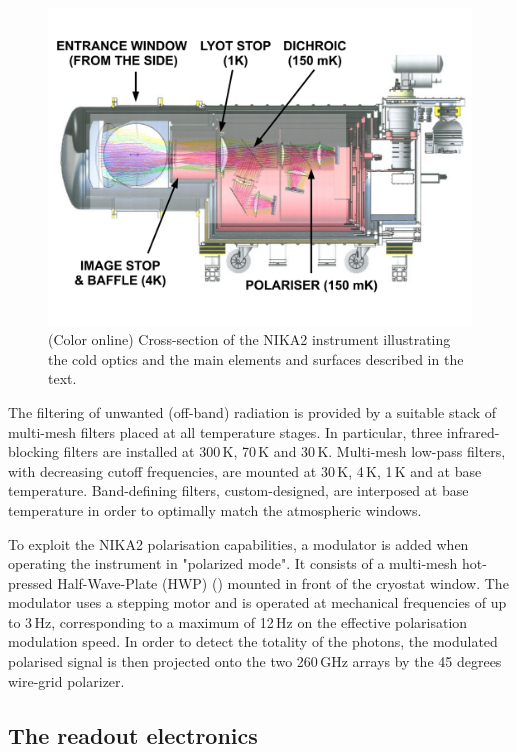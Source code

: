 \documentclass[]{aa} %
\begin{document}
\begin{figure}[h]
   \centering
   \includegraphics[width=.95\linewidth]{NIKA2_optics.pdf}
      \caption{(Color online) Cross-section of the NIKA2 instrument illustrating the cold optics and the main elements and surfaces described in the text.}
         \label{Cryostat_optics}
\end{figure}

The filtering of unwanted (off-band) radiation is provided by a suitable stack
of multi-mesh filters placed at all temperature stages. In particular, three
infrared-blocking filters are installed at 300\,K, 70\,K and 30\,K. Multi-mesh
low-pass filters, with decreasing cutoff frequencies, are mounted at 30\,K,
4\,K, 1\,K and at base temperature. Band-defining filters, custom-designed, are
interposed at base temperature in order to optimally match the atmospheric
windows.

To exploit the NIKA2 polarisation capabilities, a modulator is added when
operating the instrument in "polarized mode". It consists of a multi-mesh
hot-pressed Half-Wave-Plate (HWP) (\cite{Pisano2016}) mounted in front of the
cryostat window. The modulator uses a stepping motor and is operated at
mechanical frequencies of up to 3\,Hz, corresponding to a maximum of 12\,Hz on
the effective polarisation modulation speed. In order to detect the totality of
the photons, the modulated polarised signal is then projected onto the two
260\,GHz arrays by the 45 degrees wire-grid polarizer.


 \subsection{The readout electronics}
\end{document}
